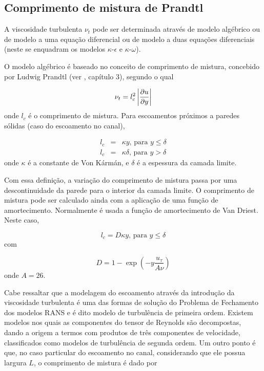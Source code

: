\subsection{Comprimento de mistura de Prandtl}

A viscosidade turbulenta $\nu_t$ pode ser determinada através de modelo algébrico ou de modelo a uma equação diferencial ou de modelo a duas equações diferenciais (neste se enquadram os modelos $\kappa$-$\epsilon$ e $\kappa$-$\omega$).

O modelo algébrico é baseado no conceito de comprimento de mistura, concebido por Ludwig Prandtl (ver \citet{FREIRE02}, capítulo 3), segundo o qual

\begin{equation}
  \nu_t = l_c^2\left|\frac{\partial u}{\partial y}\right|
\end{equation}
onde $l_c$ é o comprimento de mistura. Para escoamentos próximos a paredes sólidas (caso do escoamento no canal), 

\begin{subequations}
  \begin{eqnarray}
    l_c&=&\kappa y\text{, para }y\leq\delta\\
    l_c&=&\kappa \delta\text{, para }y>\delta
  \end{eqnarray}
\end{subequations}
onde $\kappa$ é a constante de Von Kármán, e $\delta$ é a espessura da camada limite.

Com essa definição, a variação do comprimento de mistura passa por uma descontinuidade da parede para o interior da camada limite. O comprimento de mistura pode ser calculado ainda com a aplicação de uma função de amortecimento. Normalmente é usada a função de amortecimento de Van Driest. Neste caso,

\begin{equation}
  l_c=D\kappa y\text{, para }y\leq\delta
\end{equation}
com

\begin{equation}
  D = 1-\exp\left(-y\frac{u_{\tau}}{A\nu}\right)
\end{equation}
onde $A = 26$.

Cabe ressaltar que a modelagem do escoamento através da introdução da viscosidade turbulenta é uma das formas de solução do Problema de Fechamento dos modelos RANS e é dito modelo de turbulência de primeira ordem. Existem modelos nos quais as componentes do tensor de Reynolds são decompostas, dando a origem a termos com produtos de três componentes de velocidade, classificados como modelos de turbulência de segunda ordem. Um outro ponto é que, no caso particular do escoamento no canal, considerando que ele possua largura $L$, o comprimento de mistura é dado por

